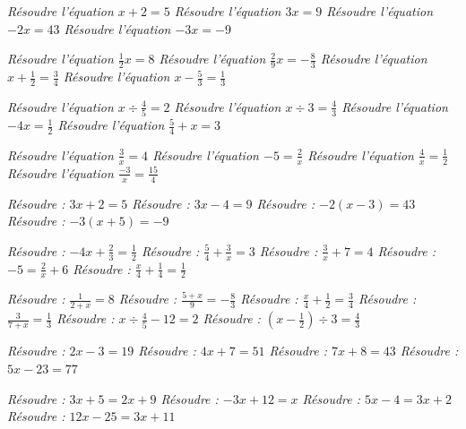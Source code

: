 \if{}  \it Résoudre l'équation  $x+2 = 5$\fi
\if{}  \it Résoudre l'équation  $3x = 9$\fi
\if{} \it Résoudre l'équation  $-2x = 43$\fi
\if{}  \it Résoudre l'équation  $-3 x = -9$ \fi

\if{}  \it Résoudre l'équation  $\frac12 x = 8$ \fi
\if{}  \it Résoudre l'équation  $\frac29 x = - \frac83$\fi
\if{}  \it Résoudre l'équation  $x+ \frac12 = \frac 34$\fi
\if{}  \it Résoudre l'équation  $x - \frac53 = \frac13$ \fi

\if{}  \it Résoudre l'équation  $ x \div \frac45 = 2 $\fi
\if{}  \it Résoudre l'équation  $x\div 3 = \frac43$\fi
\if{}  \it Résoudre l'équation  $-4 x = \frac12$\fi
\if{}  \it Résoudre l'équation  $ \frac54  + x = 3$\fi

\if{} \it Résoudre l'équation  $\frac3x = 4$\fi
\if{}  \it Résoudre l'équation  $-5 = \frac2x$\fi
\if{}  \it Résoudre l'équation  $\frac{4}x = \frac12$\fi
\if{}  \it Résoudre l'équation  $\frac{-3}{x} = \frac{15}4$\fi



\if{}  \it Résoudre : $3x+2 = 5$\fi
\if{}  \it Résoudre : $3x-4 = 9$\fi
\if{}  \it Résoudre : $-2(x-3) = 43$\fi
\if{}  \it Résoudre : $-3(x+5) = -9$\fi


\if{}  \it Résoudre : $-4 x + \frac23 = \frac12$\fi
\if{}  \it Résoudre : $ \frac54  + \frac3x = 3$\fi
\if{}  \it Résoudre : $\frac3x + 7 = 4$\fi
\if{}  \it Résoudre : $-5 = \frac2x + 6$\fi
\if{}  \it Résoudre : $\frac{x}4 + \frac14 = \frac12$\fi


\if{}  \it Résoudre : $\frac1{2+x} = 8$ \fi
\if{}  \it Résoudre : $\frac{5+ x}9 = - \frac83$\fi
\if{}  \it Résoudre : $\frac{x}4+ \frac12 = \frac 34$\fi
\if{}  \it Résoudre : $\frac{3}{7+x} = \frac13$ \fi
\if{}  \it Résoudre : $ x \div \frac45 -12 = 2 $\fi
\if{}  \it Résoudre : $(x-\frac12)\div 3 = \frac43$\fi


\if{} \it Résoudre : $2x-3=19 $\fi
\if{} \it Résoudre : $4x + 7 = 51$\fi 
\if{} \it Résoudre : $7x + 8 = 43$\fi
\if{} \it Résoudre : $5x - 23 = 77$\fi


\if{} \it Résoudre : $3x+ 5 = 2x + 9$\fi
\if{} \it Résoudre : $-3x + 12 = x$\fi
\if{} \it Résoudre : $5x - 4 = 3x +2$\fi
\if{} \it Résoudre : $12x - 25 = 3x +11$\fi


